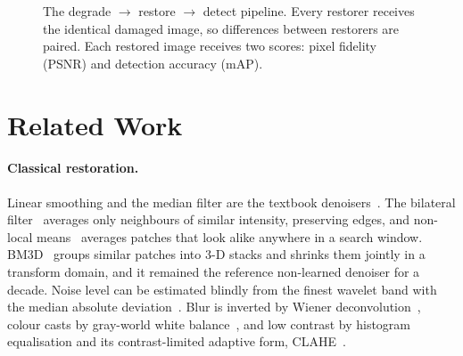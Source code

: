\documentclass[11pt]{article}
\begin{document}
\begin{figure}[t]
\centering
{}
\caption{The degrade $\rightarrow$ restore $\rightarrow$ detect pipeline. Every restorer receives the identical damaged image, so differences between restorers are paired. Each restored image receives two scores: pixel fidelity (PSNR) and detection accuracy (mAP).}
\label{fig:pipeline}
\end{figure}

\section{Related Work}
\label{sec:related}

\paragraph{Classical restoration.}
Linear smoothing and the median filter are the textbook denoisers~\citep{gonzalez2018dip}. The bilateral filter~\citep{tomasi1998bilateral} averages only neighbours of similar intensity, preserving edges, and non-local means~\citep{buades2005nlmeans} averages patches that look alike anywhere in a search window. BM3D~\citep{dabov2007bm3d} groups similar patches into 3-D stacks and shrinks them jointly in a transform domain, and it remained the reference non-learned denoiser for a decade. Noise level can be estimated blindly from the finest wavelet band with the median absolute deviation~\citep{donoho1994wavelet}. Blur is inverted by Wiener deconvolution~\citep{gonzalez2018dip}, colour casts by gray-world white balance~\citep{buchsbaum1980grayworld}, and low contrast by histogram equalisation and its contrast-limited adaptive form, CLAHE~\citep{pizer1987ahe,zuiderveld1994clahe}.
\end{document}
